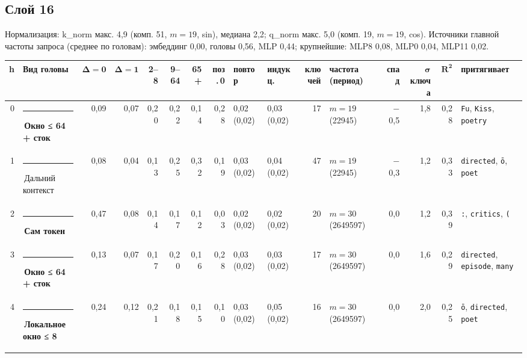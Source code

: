 \documentclass[10pt]{article}
\begin{document}
\noindent\begin{minipage}{\linewidth}
\subsection*{Слой 16}
{\small\color{ink2} Нормализация: k\_norm макс. 4,9 (комп. 51, $m{=}19$, sin), медиана 2,2; q\_norm макс. 5,0 (комп. 19, $m{=}19$, cos). Источники главной частоты запроса (среднее по головам): эмбеддинг 0,00, головы 0,56, MLP 0,44; крупнейшие: MLP8 0,08, MLP0 0,04, MLP11 0,02.}
\begin{center}{\footnotesize\begin{tabular}{|r|l|r|r|r|r|r|r|l|l|r|l|r|r|r|l|}
\hline
\rowcolor{head}\textbf{h} & \textbf{Вид головы} & $\boldsymbol{\Delta{=}0}$ & $\boldsymbol{\Delta{=}1}$ & \textbf{2–8} & \textbf{9–64} & \textbf{65+} & \textbf{поз.\,0} & \textbf{повтор} & \textbf{индукц.} & \textbf{ключей} & \textbf{частота (период)} & \textbf{спад} & $\boldsymbol{\sigma}$ \textbf{ключа} & $\boldsymbol{R^2}$ & \textbf{притягивает} \\ \hline
0 & \textcolor[HTML]{EDA100}{\rule{0.62em}{0.62em}}\,\textbf{Окно ≤ 64 + сток} & 0,09 & 0,07 & 0,20 & 0,22 & 0,14 & 0,28 & 0,02 (0,02) & 0,03 (0,02) & 17 & $m{=}19$ (22945) & $-$0,5 & 1,8 & 0,28 & \texttt{\textvisiblespace{}Fu}, \texttt{\textvisiblespace{}Kiss}, \texttt{\textvisiblespace{}poetry} \\ \hline
1 & \textcolor[HTML]{C3C2B7}{\rule{0.62em}{0.62em}}\,Дальний контекст & 0,08 & 0,04 & 0,13 & 0,25 & 0,32 & 0,19 & 0,03 (0,02) & 0,04 (0,02) & 47 & $m{=}19$ (22945) & $-$0,3 & 1,2 & 0,33 & \texttt{\textvisiblespace{}directed}, \texttt{ō}, \texttt{\textvisiblespace{}poet} \\ \hline
2 & \textcolor[HTML]{2A78D6}{\rule{0.62em}{0.62em}}\,\textbf{Сам токен} & 0,47 & 0,08 & 0,14 & 0,17 & 0,12 & 0,03 & 0,02 (0,02) & 0,02 (0,02) & 20 & $m{=}30$ (2649597) & 0,0 & 1,2 & 0,39 & \texttt{\textvisiblespace{}:}, \texttt{\textvisiblespace{}critics}, \texttt{\textvisiblespace{}(} \\ \hline
3 & \textcolor[HTML]{EDA100}{\rule{0.62em}{0.62em}}\,\textbf{Окно ≤ 64 + сток} & 0,13 & 0,07 & 0,17 & 0,20 & 0,16 & 0,28 & 0,03 (0,02) & 0,03 (0,02) & 17 & $m{=}30$ (2649597) & 0,0 & 1,6 & 0,29 & \texttt{\textvisiblespace{}directed}, \texttt{\textvisiblespace{}episode}, \texttt{\textvisiblespace{}many} \\ \hline
4 & \textcolor[HTML]{1BAF7A}{\rule{0.62em}{0.62em}}\,\textbf{Локальное окно ≤ 8} & 0,24 & 0,12 & 0,21 & 0,18 & 0,15 & 0,10 & 0,03 (0,02) & 0,05 (0,02) & 16 & $m{=}30$ (2649597) & 0,0 & 2,0 & 0,25 & \texttt{ō}, \texttt{\textvisiblespace{}directed}, \texttt{\textvisiblespace{}poet} \\ \hline

\end{tabular}}
\end{center}
\end{minipage}
\end{document}

